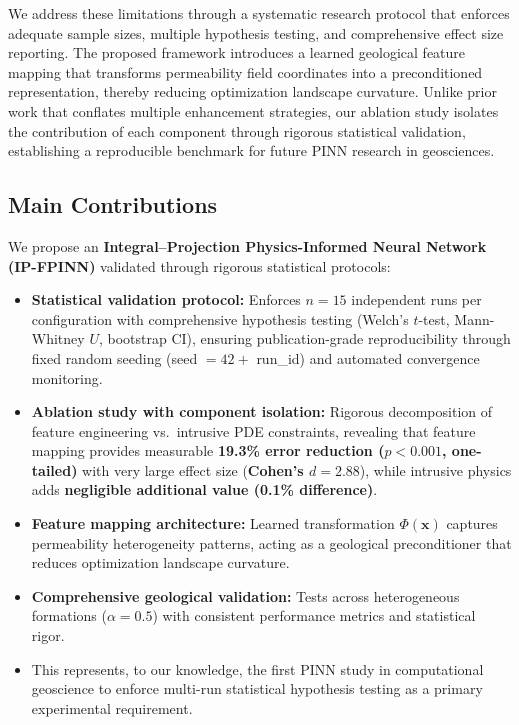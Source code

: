 \documentclass[sn-mathphys]{sn-jnl}
\begin{document}
	We address these limitations through a systematic research protocol that enforces adequate sample sizes, multiple hypothesis testing, and comprehensive effect size reporting. The proposed framework introduces a learned geological feature mapping that transforms permeability field coordinates into a preconditioned representation, thereby reducing optimization landscape curvature. Unlike prior work that conflates multiple enhancement strategies, our ablation study isolates the contribution of each component through rigorous statistical validation, establishing a reproducible benchmark for future PINN research in geosciences.
	
	\subsection{Main Contributions}
	\label{sec:contributions}
	
	We propose an \textbf{Integral--Projection Physics-Informed Neural Network (IP-FPINN)} validated through rigorous statistical protocols:
	
	\begin{itemize}
		\item \textbf{Statistical validation protocol:} Enforces $n=15$ independent runs per configuration with comprehensive hypothesis testing (Welch's $t$-test, Mann-Whitney $U$, bootstrap CI), ensuring publication-grade reproducibility through fixed random seeding (seed $=42+$ run\_id) and automated convergence monitoring.
		
		\item \textbf{Ablation study with component isolation:} Rigorous decomposition of feature engineering vs.\ intrusive PDE constraints, revealing that feature mapping provides measurable \textbf{19.3\% error reduction ($p<0.001$, one-tailed)} with very large effect size (\textbf{Cohen's $d=2.88$}), while intrusive physics adds \textbf{negligible additional value (0.1\% difference)}.
		
		\item \textbf{Feature mapping architecture:} Learned transformation $\Phi(\mathbf{x})$ captures permeability heterogeneity patterns, acting as a geological preconditioner that reduces optimization landscape curvature.
		
		\item \textbf{Comprehensive geological validation:} Tests across heterogeneous formations ($\alpha=0.5$) with consistent performance metrics and statistical rigor.
		
		\item This represents, to our knowledge, the first PINN study in computational geoscience to enforce multi-run statistical hypothesis testing as a primary experimental requirement.
	\end{itemize}
	
\end{document}
